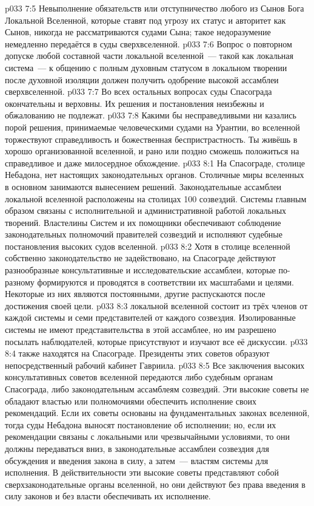 \vs p033 7:5 Невыполнение обязательств или отступничество любого из Сынов Бога Локальной Вселенной, которые ставят под угрозу их статус и авторитет как Сынов, никогда не рассматриваются судами Сына; такое недоразумение немедленно передаётся в суды сверхвселенной.
\vs p033 7:6 Вопрос о повторном допуске любой составной части локальной вселенной~--- такой как локальная система~--- к общению с полным духовным статусом в локальном творении после духовной изоляции должен получить одобрение высокой ассамблеи сверхвселенной.
\vs p033 7:7 \pc Во всех остальных вопросах суды Спасограда окончательны и верховны. Их решения и постановления неизбежны и обжалованию не подлежат.
\vs p033 7:8 Какими бы несправедливыми ни казались порой решения, принимаемые человеческими судами на Урантии, во вселенной торжествуют справедливость и божественная беспристрастность. Ты живёшь в хорошо организованной вселенной, и рано или поздно сможешь положиться на справедливое и даже милосердное обхождение.
\vs p033 8:1 На Спасограде, столице Небадона, нет настоящих законодательных органов. Столичные миры вселенных в основном занимаются вынесением решений. Законодательные ассамблеи локальной вселенной расположены на столицах 100 созвездий. Системы главным образом связаны с исполнительной и административной работой локальных творений. Властелины Систем и их помощники обеспечивают соблюдение законодательных полномочий правителей созвездий и исполняют судебные постановления высоких судов вселенной.
\vs p033 8:2 Хотя в столице вселенной собственно законодательство не задействовано, на Спасограде действуют разнообразные консультативные и исследовательские ассамблеи, которые по\hyp{}разному формируются и проводятся в соответствии их масштабами и целями. Некоторые из них являются постоянными, другие распускаются после достижения своей цели.
\vs p033 8:3 \pc {} локальной вселенной состоит из трёх членов от каждой системы и семи представителей от каждого созвездия. Изолированные системы не имеют представительства в этой ассамблее, но им разрешено посылать наблюдателей, которые присутствуют и изучают все её дискуссии.
\vs p033 8:4 \pc {} также находятся на Спасограде. Президенты этих советов образуют непосредственный рабочий кабинет Гавриила.
\vs p033 8:5 \pc Все заключения высоких консультативных советов вселенной передаются либо судебным органам Спасограда, либо законодательным ассамблеям созвездий. Эти высокие советы не обладают властью или полномочиями обеспечить исполнение своих рекомендаций. Если их советы основаны на фундаментальных законах вселенной, тогда суды Небадона выносят постановление об исполнении; но, если их рекомендации связаны с локальными или чрезвычайными условиями, то они должны передаваться вниз, в законодательные ассамблеи созвездия для обсуждения и введения закона в силу, а затем~--- властям системы для исполнения. В действительности эти высокие советы представляют собой сверхзаконодательные органы вселенной, но они действуют без права введения в силу законов и без власти обеспечивать их исполнение.
